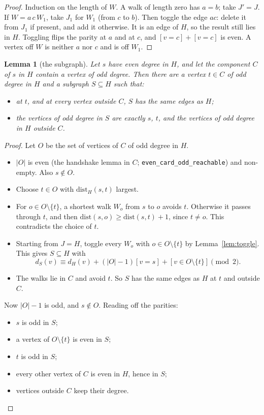 \documentclass[11pt]{amsart}
\newtheorem{lemma}[theorem]{Lemma}
\theoremstyle{definition}
\newcommand{\lean}[1]{\quad{\footnotesize[Lean: \texttt{#1}]}}
\begin{document}
\begin{proof}
Induction on the length of $W$. A walk of length zero has $a=b$; take $J'=J$. If $W=a\,c\,W_1$, take
$J_1$ for $W_1$ (from $c$ to $b$). Then toggle the edge $ac$: delete it from $J_1$ if present, and add
it otherwise. It is an edge of $H$, so the result still lies in $H$. Toggling flips the parity at $a$
and at $c$, and $[v=c]+[v=c]$ is even. A vertex off $W$ is neither $a$ nor $c$ and is off $W_1$.
\end{proof}

\begin{lemma}[the subgraph]\label{lem:sub}
Let $s$ have even degree in $H$, and let the component $C$ of $s$ in $H$ contain a vertex of odd degree.
Then there are a vertex $t\in C$ of odd degree in $H$ and a subgraph $S\subseteq H$ such that:
\begin{itemize}
\item at $t$, and at every vertex outside $C$, $S$ has the same edges as $H$;
\item the vertices of odd degree in $S$ are exactly $s$, $t$, and the vertices of odd degree in $H$
outside $C$.
\end{itemize}
\lean{exists\_inv\_subgraph}
\end{lemma}

\begin{proof}
Let $O$ be the set of vertices of $C$ of odd degree in $H$.
\begin{itemize}
\item $|O|$ is even (the handshake lemma in $C$; \texttt{even\_card\_odd\_reachable}) and non-empty.
Also $s\notin O$.
\item Choose $t\in O$ with $\mathrm{dist}_H(s,t)$ largest.
\item For $o\in O\setminus\{t\}$, a shortest walk $W_o$ from $s$ to $o$ avoids $t$. Otherwise it passes
through $t$, and then $\mathrm{dist}(s,o)\ge\mathrm{dist}(s,t)+1$, since $t\ne o$. This contradicts
the choice of $t$.
\item Starting from $J=H$, toggle every $W_o$ with $o\in O\setminus\{t\}$ by Lemma~\ref{lem:toggle}.
This gives $S\subseteq H$ with
\[
d_S(v)\equiv d_H(v)+(|O|-1)[v=s]+[v\in O\setminus\{t\}]\pmod 2.
\]
\item The walks lie in $C$ and avoid $t$. So $S$ has the same edges as $H$ at $t$ and outside $C$.
\end{itemize}
Now $|O|-1$ is odd, and $s\notin O$. Reading off the parities:
\begin{itemize}
\item $s$ is odd in $S$;
\item a vertex of $O\setminus\{t\}$ is even in $S$;
\item $t$ is odd in $S$;
\item every other vertex of $C$ is even in $H$, hence in $S$;
\item vertices outside $C$ keep their degree.\qedhere
\end{itemize}
\end{proof}
\end{document}
